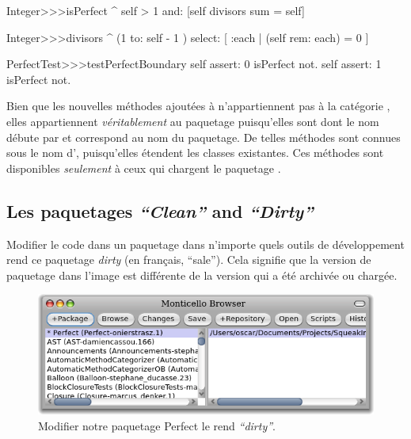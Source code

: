 \documentclass[a4paper,10pt,twoside]{book}
\begin{document}

\begin{code}{}
Integer>>>isPerfect
	^ self > 1 and: [self divisors sum = self]

Integer>>>divisors
	^ (1 to: self - 1 ) select: [ :each | (self rem: each) = 0 ]

PerfectTest>>>testPerfectBoundary
	self assert: 0 isPerfect not.
	self assert: 1 isPerfect not.
\end{code}

Bien que les nouvelles méthodes ajoutées à  
n'appartiennent pas à la catégorie , elles appartiennent
\emph{véritablement} au paquetage   puisqu'elles sont  %
dont le nom débute par \ct{*} et correspond au nom du paquetage. De
telles méthodes sont connues sous le nom d', puisqu'elles étendent les classes existantes. Ces méthodes
sont disponibles \emph{seulement} à ceux qui chargent le paquetage
.

\subsection{Les paquetages \emph{``Clean''} and \emph{``Dirty''}}

Modifier le code dans un paquetage dans n'importe quels outils de
développement rend ce paquetage \emph{dirty} (en français, ``sale'').
Cela signifie que la version de paquetage dans l'image est différente
de la version qui a été archivée ou chargée.

\begin{figure}[ht]\centering
	\includegraphics[width=\textwidth]{dirty}
	\caption{Modifier notre paquetage Perfect le rend \emph{``dirty''}.}
\end{figure}
\end{document}
